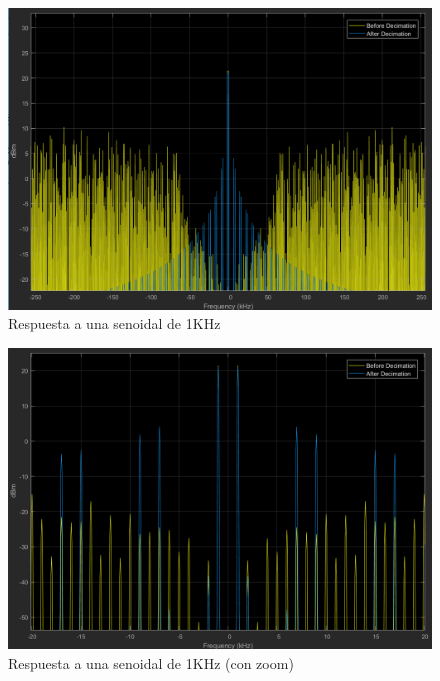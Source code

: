 \documentclass[assd_tp3_main.tex]{subfiles}
\begin{document}
\begin{figure}[H]
\centering
\includegraphics[width=1\linewidth]{images/ej4/sin_response_1K.png}
\caption{Respuesta a una senoidal de 1KHz}
\label{fig:sin_response_1K}
\end{figure}

\begin{figure}[H]
\centering
\includegraphics[width=1\linewidth]{images/ej4/sin_response_1K_zoom.png}
\caption{Respuesta a una senoidal de 1KHz (con zoom)}
\label{fig:sin_response_1K_zoom}
\end{figure}
\end{document}
